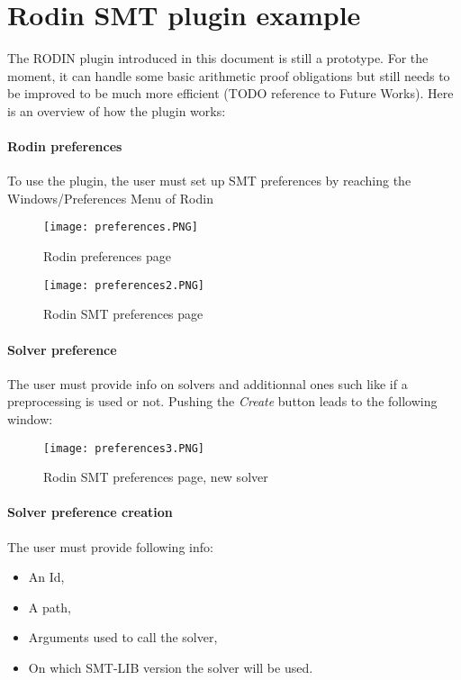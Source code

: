 \section{Rodin SMT plugin example}
The RODIN plugin introduced in this document is still a prototype. For the moment, it can handle some basic arithmetic proof obligations but still needs to be improved to be much more efficient (TODO reference to Future Works). 
Here is an overview of how the plugin works:

\paragraph{Rodin preferences}
To use the plugin, the user must set up SMT preferences by reaching the Windows/Preferences Menu of Rodin
\begin{figure}
\centering
\texttt{[image: preferences.PNG]}
\caption{Rodin preferences page} 
\label{Fig: Rodin Preferences}
\end{figure}

\begin{figure}
\centering
\texttt{[image: preferences2.PNG]}
\caption{Rodin SMT preferences page} 
\label{Fig: Rodin SMT Preferences}
\end{figure}

\paragraph{Solver preference}
The user must provide info on solvers and additionnal ones such like if a preprocessing is used or not. Pushing the \textit{Create} button leads to the following window:

\begin{figure}
\centering
\texttt{[image: preferences3.PNG]}
\caption{Rodin SMT preferences page, new solver} 
\label{Fig: New solver in SMT preferences}
\end{figure}

\paragraph{Solver preference creation}
The user must provide following info:

\begin{itemize}
\item An Id,
\item A path,
\item Arguments used to call the solver,
\item On which SMT-LIB version the solver will be used.   
\end{itemize}


